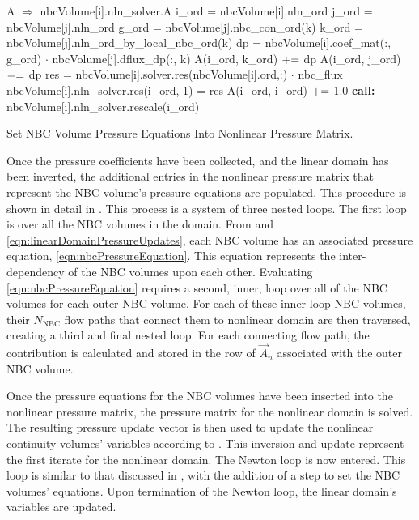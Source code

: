 \begin{algo}[ht!]
\setlength{\baselineskip}{0.625\baselineskip}
\begin{algorithmic}[1]
	\Set A $\Rightarrow$ nbcVolume[i].nln\_solver.A
	\Set i\_ord = nbcVolume[i].nln\_ord
		\Set j\_ord = nbcVolume[j].nln\_ord
			\Set g\_ord = nbcVolume[j].nbc\_con\_ord(k)
			\Set k\_ord = nbcVolume[j].nln\_ord\_by\_local\_nbc\_ord(k)
			\Set dp = nbcVolume[i].coef\_mat(:, g\_ord) $\cdot$ nbcVolume[j].dflux\_dp(:, k)
			\Set A(i\_ord, k\_ord) $\mathrel{+}=$ dp
			\Set A(i\_ord, j\_ord) $\mathrel{-}=$ dp
		\EndFor
	\EndFor
	\Set res = nbcVolume[i].solver.res(nbcVolume[i].ord,:) $\cdot$ nbc\_flux
	\Set nbcVolume[i].nln\_solver.res(i\_ord, 1) = res
	\Set A(i\_ord, i\_ord) $\mathrel{+}=$ 1.0
	\State \textbf{call:} nbcVolume[i].nln\_solver.rescale(i\_ord)
\EndFor
\end{algorithmic}
\caption{Set NBC Volume Pressure Equations Into Nonlinear Pressure Matrix.}
\label{alg:domDecompSetMat}
\end{algo}

Once the pressure coefficients have been collected, and the linear domain has been inverted, the additional entries in the nonlinear pressure matrix that represent the NBC volume's pressure equations are populated.
This procedure is shown in detail in .
This process is a system of three nested loops.
The first loop is over all the NBC volumes in the domain.
From  and \eqref{eqn:linearDomainPressureUpdates}, each NBC volume has an associated pressure equation, \eqref{eqn:nbcPressureEquation}.
This equation represents the inter-dependency of the NBC volumes upon each other.
Evaluating \eqref{eqn:nbcPressureEquation} requires a second, inner, loop over all of the NBC volumes for each outer NBC volume.
For each of these inner loop NBC volumes, their $N_{\text{NBC}}$ flow paths that connect them to nonlinear domain are then traversed, creating a third and final nested loop.
For each connecting flow path, the contribution is calculated and stored in the row of $\vec{A}_{n}$ associated with the outer NBC volume.

Once the pressure equations for the NBC volumes have been inserted into the nonlinear pressure matrix, the pressure matrix for the nonlinear domain is solved.
The resulting pressure update vector is then used to update the nonlinear continuity volumes' variables according to .
This inversion and update represent the first iterate for the nonlinear domain.
The Newton loop is now entered.
This loop is similar to that discussed in , with the addition of a step to set the NBC volumes' equations.
Upon termination of the Newton loop, the linear domain's variables are updated.

